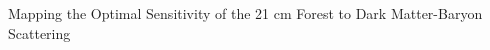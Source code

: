 \documentclass[]{article}
\begin{document}
Mapping the Optimal Sensitivity of the 21 cm Forest to Dark Matter-Baryon Scattering
\end{document}

